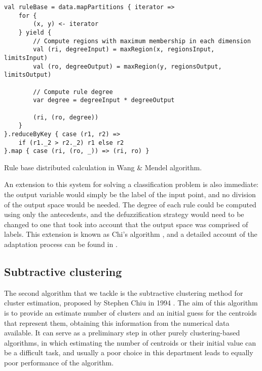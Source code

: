 \begin{Listing}[h!]
\begin{lstlisting}[basicstyle=\normalsize\ttfamily, xleftmargin=.5cm, aboveskip=0em, belowskip=0em]
val ruleBase = data.mapPartitions { iterator =>
    for {
        (x, y) <- iterator
    } yield {
        // Compute regions with maximum membership in each dimension
        val (ri, degreeInput) = maxRegion(x, regionsInput, limitsInput)
        val (ro, degreeOutput) = maxRegion(y, regionsOutput, limitsOutput)

        // Compute rule degree
        var degree = degreeInput * degreeOutput

        (ri, (ro, degree))
    }
}.reduceByKey { case (r1, r2) =>
    if (r1._2 > r2._2) r1 else r2
}.map { case (ri, (ro, _)) => (ri, ro) }
\end{lstlisting}
\caption{Rule base distributed calculation in Wang \& Mendel algorithm.}
  \label{lst:wm}
\end{Listing}

An extension to this system for solving a classification problem is also immediate: the output variable would simply be the label of the input point, and no division of the output space would be needed. The degree of each rule could be computed using only the antecedents, and the defuzzification strategy would need to be changed to one that took into account that the output space was comprised of labels. This extension is known as Chi's algorithm \cite[141]{chi1996fuzzy}, and a detailed account of the adaptation process can be found in \cite{estevez2018revisiting}.

\subsection{Subtractive clustering}

The second algorithm that we tackle is the subtractive clustering method for cluster estimation, proposed by Stephen Chiu in 1994 \cite{chiu1994identification}. The aim of this algorithm is to provide an estimate number of clusters and an initial guess for the centroids that represent them, obtaining this information from the numerical data available. It can serve as a preliminary step in other purely clustering-based algorithms, in which estimating the number of centroids or their initial value can be a difficult task, and usually a poor choice in this department leads to equally poor performance of the algorithm.

